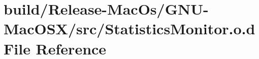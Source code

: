 \hypertarget{_mac_os_2_g_n_u-_mac_o_s_x_2src_2_statistics_monitor_8o_8d}{}\section{build/\+Release-\/\+Mac\+Os/\+G\+N\+U-\/\+Mac\+O\+S\+X/src/\+Statistics\+Monitor.o.\+d File Reference}
\label{_mac_os_2_g_n_u-_mac_o_s_x_2src_2_statistics_monitor_8o_8d}
